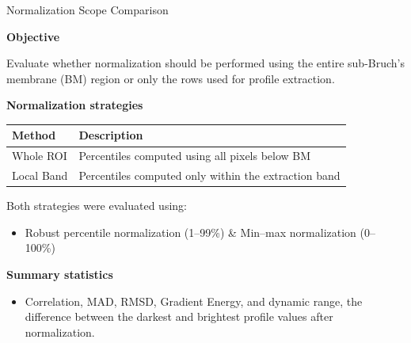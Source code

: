 \documentclass[aspectratio=169]{beamer}
\begin{document}
\begin{frame}{Normalization Scope Comparison}

\textbf{Objective}

Evaluate whether normalization should be performed using the entire
sub-Bruch's membrane (BM) region or only the rows used for profile extraction.

\vspace{0.3cm}

\textbf{Normalization strategies}

\begin{table}
\centering
\small
\begin{tabular}{ll}
\toprule
Method & Description\\
\midrule
Whole ROI & Percentiles computed using all pixels below BM\\
Local Band & Percentiles computed only within the extraction band\\
\bottomrule
\end{tabular}
\end{table}

\vspace{0.3cm}

Both strategies were evaluated using:

\begin{itemize}
\item Robust percentile normalization (1--99\%) \& Min--max normalization (0--100\%)
\end{itemize}

\vspace{0.2cm}

\textbf{Summary statistics}

\begin{itemize}
\item Correlation, MAD, RMSD, Gradient Energy, and dynamic range, the difference between the darkest and brightest profile values after normalization.
\end{itemize}

\end{frame}
\end{document}
